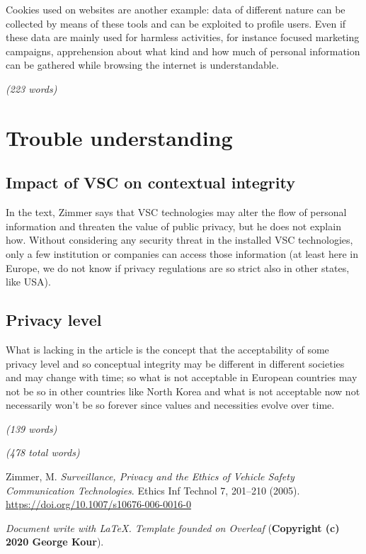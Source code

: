 Cookies used on websites are another example: data of different nature can be collected by means of these tools and can be exploited to profile users. Even if these data are mainly used for harmless activities, for instance focused marketing campaigns, apprehension about what kind and how much of personal information can be gathered while browsing the internet is understandable.

\emph{(223 words)}

\section{Trouble understanding}
\subsection{Impact of VSC on contextual integrity}
In the text, Zimmer says that VSC technologies may alter the flow of personal information and threaten the value of public privacy, but he does not explain how. Without considering any security threat in the installed VSC technologies, only a few institution or companies can access those information (at least here in Europe, we do not know if privacy regulations are so strict also in other states, like USA).

\subsection{Privacy level}
What is lacking in the article is the concept that the acceptability of some privacy level and so conceptual integrity may be different in different societies  and may change with time; so what is not acceptable in European countries may not be so in other countries like North Korea and what is not acceptable now not necessarily won't be so forever since values and necessities evolve over time.

\emph{(139 words)}

\emph{(478 total words)}

\newpage
\begin{thebibliography}{99}


Zimmer, M. \textit{Surveillance, Privacy and the Ethics of Vehicle Safety Communication Technologies}. Ethics Inf Technol 7, 201–210 (2005). \url{https://doi.org/10.1007/s10676-006-0016-0}

\end{thebibliography}

\textit{Document write with \LaTeX. Template founded on Overleaf} (\textbf{Copyright (c) 2020 George Kour}).